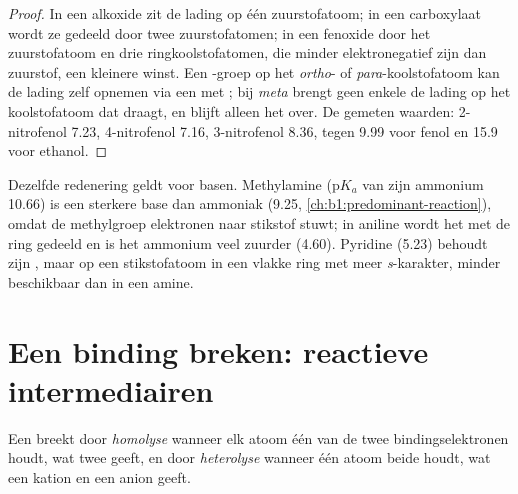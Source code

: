 \begin{proof}
In een alkoxide zit de lading op één zuurstofatoom; in een carboxylaat
wordt ze gedeeld door twee zuurstofatomen; in een fenoxide door het
zuurstofatoom en drie ringkoolstofatomen, die minder elektronegatief zijn
dan zuurstof, een kleinere winst. Een -groep op het
\textit{ortho}- of \textit{para}-koolstofatoom kan de lading zelf opnemen
via een  met ; bij \textit{meta}
brengt geen enkele  de lading op het koolstofatoom dat
 draagt, en blijft alleen het  over. De gemeten
waarden: 2-nitrofenol 7.23, 4-nitrofenol 7.16, 3-nitrofenol 8.36, tegen
9.99 voor fenol en 15.9 voor ethanol.
\end{proof}

Dezelfde redenering geldt voor basen. Methylamine ($\mathrm{p}K_a$ van
zijn ammonium 10.66) is een sterkere base dan ammoniak (9.25,
\cref{ch:b1:predominant-reaction}), omdat de methylgroep elektronen naar
stikstof stuwt; in aniline wordt het  met de ring gedeeld en is
het ammonium veel zuurder (4.60). Pyridine (5.23) behoudt zijn , maar op een stikstofatoom in een vlakke ring met meer
\textit{s}-karakter, minder beschikbaar dan in een amine.


\section{Een binding breken: reactieve intermediairen}

\begin{definition}\label{def:b1:electronic-effects:cleavage}
Een  breekt door \emph{homolyse} wanneer
elk atoom één van de twee bindingselektronen houdt, wat twee 
geeft, en door \emph{heterolyse} wanneer één atoom
beide houdt, wat een kation en een anion geeft.
\end{definition}

